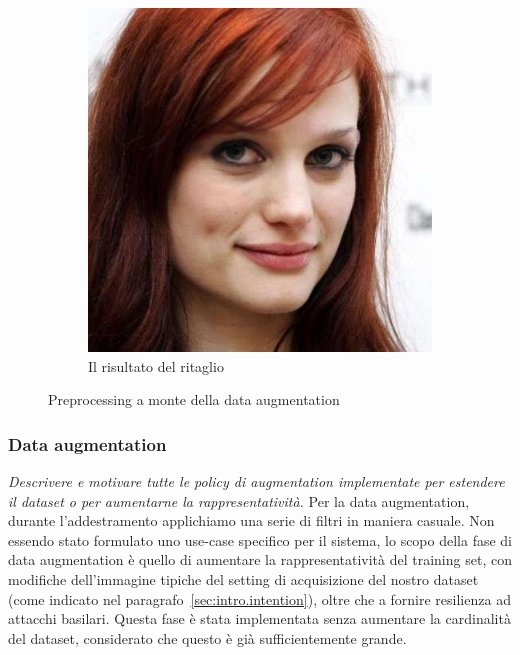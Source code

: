 \begin{figure}[ht]
\begin{subfigure}{0.3\textwidth}
\includegraphics[width=\textwidth]{./Images/preprocessed.jpg}
\caption{Il risultato del ritaglio}
\label{sfig:preprocessed}
\end{subfigure}
\caption{Preprocessing a monte della data augmentation}
\label{fig:preprocessing}
\end{figure}

\subsubsection{Data augmentation}
\emph{Descrivere e motivare tutte le policy di augmentation implementate per estendere il dataset o per aumentarne la rappresentatività.}
Per la data augmentation, durante l'addestramento applichiamo una serie di filtri in maniera casuale. Non essendo stato formulato uno use-case specifico per il sistema, lo scopo della fase di data augmentation è quello di aumentare la rappresentatività del training set, con modifiche dell'immagine tipiche del setting di acquisizione del nostro dataset (come indicato nel paragrafo~\ref{sec:intro.intention}), oltre che a fornire resilienza ad attacchi basilari. Questa fase è stata implementata senza aumentare la cardinalità del dataset, considerato che questo è già sufficientemente grande.

